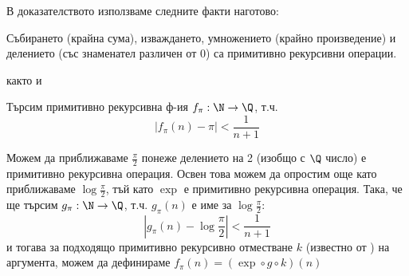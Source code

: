 \begin{solution}
    В доказателството използваме следните факти наготово:
    \begin{fact}
        Събирането (крайна сума), изваждането, умножението (крайно произведение) и делението (със знаменател различен от 0) са примитивно рекурсивни операции.
    \end{fact}
    както и 

    Търсим примитивно рекурсивна ф-ия $f_\pi: \N \to \Q$, т.ч.
    \begin{equation*}
        |f_\pi(n) - \pi| < \frac{1}{n+1}
    \end{equation*}

    Можем да приближаваме $\frac{\pi}{2}$ понеже делението на 2 (изобщо с $\Q$ число) е примитивно рекурсивна операция. Освен това можем да опростим още като приближаваме $\log \frac{\pi}{2}$, тъй като $\exp$ е примитивно рекурсивна операция. Така, че ще търсим $g_\pi: \N \to \Q$, т.ч. $g_\pi(n)$ е име за $\log \frac{\pi}{2}$:
    \begin{equation}
        |g_\pi(n) - \log \frac{\pi}{2}| < \frac{1}{n+1}
    \end{equation}
    и тогава за подходящо примитивно рекурсивно отместване $k$ (известно от ) на аргумента, можем да дефинираме $f_\pi(n) = (\exp \circ g \circ k) (n)$


\end{solution}
